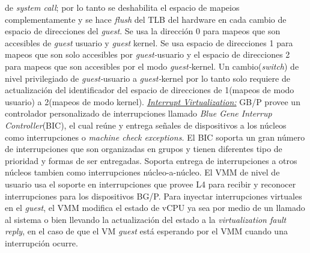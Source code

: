 de \emph{system call}; por lo tanto se deshabilita el espacio de mapeios complementamente y se hace \emph{flush} del TLB del hardware en cada cambio de espacio de direcciones del \emph{guest}. Se usa la dirección 0 para mapeos que son accesibles de \emph{guest} usuario y \emph{guest} kernel. Se usa espacio de direcciones 1 para mapeos que son solo accesibles por \emph{guest-}usuario y el espacio de direcciones 2 para mapeos que son accesibles por el modo \emph{guest-}kernel. Un cambio(\emph{switch}) de nivel privilegiado de \emph{guest-}usuario a \emph{guest-}kernel por lo tanto solo requiere de actualización del identificador del espacio de direcciones de 1(mapeos de modo usuario) a 2(mapeos de modo kernel). \underline{\emph{Interrupt Virtualization:}} GB/P provee un controlador personalizado de interrupciones llamado \emph{Blue Gene Interrup Controller}(BIC), el cual reúne y entrega señales de dispositivos a los núcleos como interrupciones o \emph{machine check exceptions.} El BIC soporta un gran número de interrupciones que son organizadas en grupos y tienen diferentes tipo de prioridad y formas de ser entregadas. Soporta entrega de interrupciones a otros núcleos tambien como interrupciones núcleo-a-núcleo. El VMM de nivel de usuario usa el soporte en interrupciones que provee L4 para recibir y reconocer interrupciones para los dispositivos BG/P. Para inyectar interrupciones virtuales en el \emph{guest}, el VMM modifica el estado de vCPU ya sea por medio de un llamado al sistema o bien llevando la actualización del estado a la \emph{virtualization fault reply}, en el caso de que el VM \emph{guest} está esperando por el VMM cuando una interrupción ocurre.

